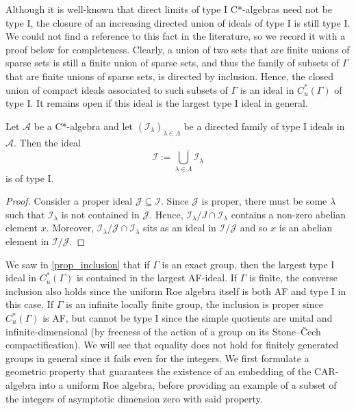 \documentclass[12pt, a4paper, oneside]{amsart}
\newcommand{\0}{\mathbf{0}}
\newcommand{\1}{\mathbf{1}}
\newcommand{\A}{\mathscr{A}}
\newcommand{\I}{\mathscr{I}}
\newcommand{\J}{\mathscr{J}}
\begin{document}
	 Although it is well-known that direct limits of type I C*-algebras need not be type I, the closure of an increasing directed union of ideals of type I is still type I. We could not find a reference to this fact in the literature, so we record it with a proof below for completeness. Clearly, a union of two sets that are finite unions of sparse sets is still a finite union of sparse sets, and thus the family of subsets of \(\Gamma\) that are finite unions of sparse sets, is directed by inclusion. Hence, the closed union of compact ideals associated to such subsets of \(\Gamma\) is an ideal in \(C_u^*(\Gamma)\) of type I. It remains open if this ideal is the largest type I ideal in general. 
	 
	 \begin{proposition}
	 	Let \(\A\) be a C*-algebra and let \((\I_\lambda)_{\lambda \in \Lambda}\) be a directed family of type I ideals in \(\A\). Then the ideal \[\I := \overline{\bigcup_{\lambda \in \Lambda} \I_\lambda}\] is of type I. 
	 \end{proposition}
	 
	 \begin{proof}
	 	Consider a proper ideal \(\J \subseteq \I\). Since \(\J\) is proper, there must be some \(\lambda\) such that \(\I_{\lambda}\) is not contained in \(\J\). Hence, \(\I_{\lambda}/J \cap \I_{\lambda}\) contains a non-zero abelian element \(x\). Moreover,  \(\I_{\lambda}/\J \cap \I_{\lambda}\) sits as an ideal in \(\I/\J\) and so \(x\) is an abelian element in \(\I/\J\). 
	 \end{proof}
	
	 We saw in \cref{prop_inclusion} that if \(\Gamma\) is an exact group, then the largest type I ideal in \(C_u^*(\Gamma)\) is contained in the largest AF-ideal. If \(\Gamma\) is finite, the converse inclusion also holds since the uniform Roe algebra itself is both AF and type I in this case. If \(\Gamma\) is an infinite locally finite group, the inclusion is proper since \(C_u^*(\Gamma)\) is AF, but cannot be type I since the simple quotients are unital and infinite-dimensional (by freeness of the action of a group on its Stone--\v{C}ech compactification). We will see that equality does not hold for finitely generated groups in general since it fails even for the integers. We first formulate a geometric property that guarantees the existence of an embedding of the CAR-algebra into a uniform Roe algebra, before providing an example of a subset of the integers of asymptotic dimension zero with said property. 
	
\end{document}
